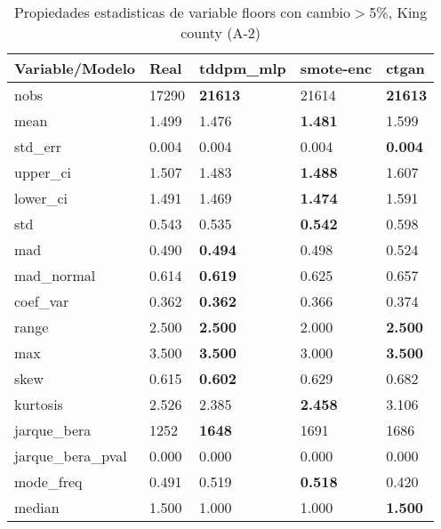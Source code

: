 \begin{table}[H]
\centering
\fontsize{8}{14}\selectfont
\caption{Propiedades estadisticas de variable floors con cambio\ensuremath{>}5\%, King county (A-2)}
\label{table-stats-king county-a-2-floors-short}
\begin{tabular}{|l|m{10em}|m{10em}|m{10em}|m{10em}|}
\hline
 \rowcolor[gray]{0.8}
Variable/Modelo & Real & tddpm\_mlp & smote-enc & ctgan \\
\hline nobs & 17290 & \bfseries 21613 & \cellcolor[rgb]{0.9, 0.54, 0.52} 21614 & \bfseries 21613 \\
\hline mean & 1.499 & 1.476 & \bfseries 1.481 & \cellcolor[rgb]{0.9, 0.54, 0.52} 1.599 \\
\hline std\_err & 0.004 & \cellcolor[rgb]{0.9, 0.54, 0.52} 0.004 & 0.004 & \bfseries 0.004 \\
\hline upper\_ci & 1.507 & 1.483 & \bfseries 1.488 & \cellcolor[rgb]{0.9, 0.54, 0.52} 1.607 \\
\hline lower\_ci & 1.491 & 1.469 & \bfseries 1.474 & \cellcolor[rgb]{0.9, 0.54, 0.52} 1.591 \\
\hline std & 0.543 & 0.535 & \bfseries 0.542 & \cellcolor[rgb]{0.9, 0.54, 0.52} 0.598 \\
\hline mad & 0.490 & \bfseries 0.494 & 0.498 & \cellcolor[rgb]{0.9, 0.54, 0.52} 0.524 \\
\hline mad\_normal & 0.614 & \bfseries 0.619 & 0.625 & \cellcolor[rgb]{0.9, 0.54, 0.52} 0.657 \\
\hline coef\_var & 0.362 & \bfseries 0.362 & 0.366 & \cellcolor[rgb]{0.9, 0.54, 0.52} 0.374 \\
\hline range & 2.500 & \bfseries 2.500 & \cellcolor[rgb]{0.9, 0.54, 0.52} 2.000 & \bfseries 2.500 \\
\hline max & 3.500 & \bfseries 3.500 & \cellcolor[rgb]{0.9, 0.54, 0.52} 3.000 & \bfseries 3.500 \\
\hline skew & 0.615 & \bfseries 0.602 & 0.629 & \cellcolor[rgb]{0.9, 0.54, 0.52} 0.682 \\
\hline kurtosis & 2.526 & 2.385 & \bfseries 2.458 & \cellcolor[rgb]{0.9, 0.54, 0.52} 3.106 \\
\hline jarque\_bera & 1252 & \bfseries 1648 & \cellcolor[rgb]{0.9, 0.54, 0.52} 1691 & 1686 \\
\hline jarque\_bera\_pval & 0.000 & 0.000 & 0.000 & 0.000 \\
\hline mode\_freq & 0.491 & 0.519 & \bfseries 0.518 & \cellcolor[rgb]{0.9, 0.54, 0.52} 0.420 \\
\hline median & 1.500 & \cellcolor[rgb]{0.9, 0.54, 0.52} 1.000 & \cellcolor[rgb]{0.9, 0.54, 0.52} 1.000 & \bfseries 1.500 \\
\hline
\end{tabular}
\end{table}
